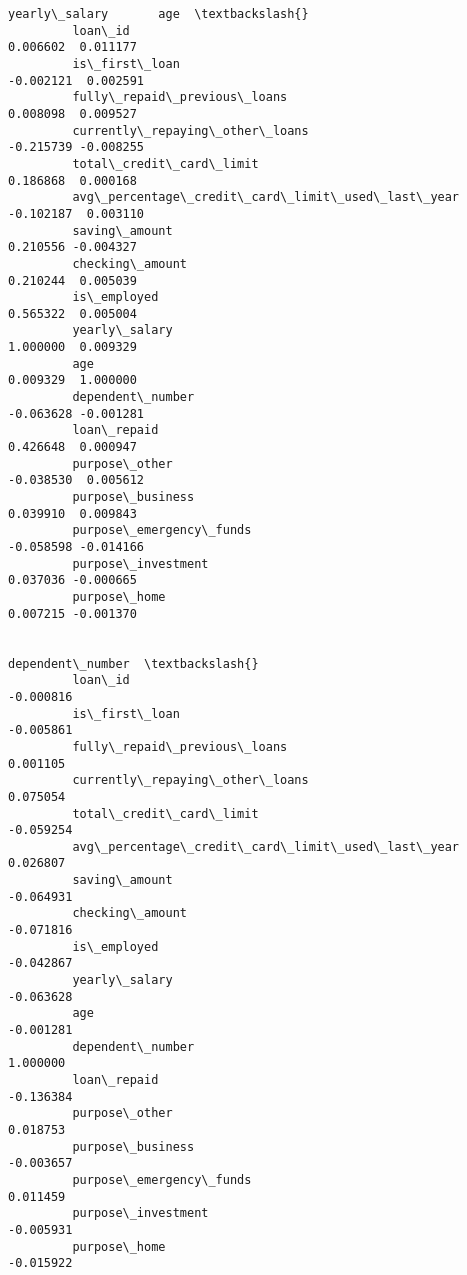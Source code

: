 \documentclass{report}
\begin{document}
\begin{Verbatim}[commandchars=\\\{\}]
                                                          yearly\_salary       age  \textbackslash{}
         loan\_id                                               0.006602  0.011177   
         is\_first\_loan                                        -0.002121  0.002591   
         fully\_repaid\_previous\_loans                           0.008098  0.009527   
         currently\_repaying\_other\_loans                       -0.215739 -0.008255   
         total\_credit\_card\_limit                               0.186868  0.000168   
         avg\_percentage\_credit\_card\_limit\_used\_last\_year      -0.102187  0.003110   
         saving\_amount                                         0.210556 -0.004327   
         checking\_amount                                       0.210244  0.005039   
         is\_employed                                           0.565322  0.005004   
         yearly\_salary                                         1.000000  0.009329   
         age                                                   0.009329  1.000000   
         dependent\_number                                     -0.063628 -0.001281   
         loan\_repaid                                           0.426648  0.000947   
         purpose\_other                                        -0.038530  0.005612   
         purpose\_business                                      0.039910  0.009843   
         purpose\_emergency\_funds                              -0.058598 -0.014166   
         purpose\_investment                                    0.037036 -0.000665   
         purpose\_home                                          0.007215 -0.001370   
         
                                                          dependent\_number  \textbackslash{}
         loan\_id                                                 -0.000816   
         is\_first\_loan                                           -0.005861   
         fully\_repaid\_previous\_loans                              0.001105   
         currently\_repaying\_other\_loans                           0.075054   
         total\_credit\_card\_limit                                 -0.059254   
         avg\_percentage\_credit\_card\_limit\_used\_last\_year          0.026807   
         saving\_amount                                           -0.064931   
         checking\_amount                                         -0.071816   
         is\_employed                                             -0.042867   
         yearly\_salary                                           -0.063628   
         age                                                     -0.001281   
         dependent\_number                                         1.000000   
         loan\_repaid                                             -0.136384   
         purpose\_other                                            0.018753   
         purpose\_business                                        -0.003657   
         purpose\_emergency\_funds                                  0.011459   
         purpose\_investment                                      -0.005931   
         purpose\_home                                            -0.015922   
         

\end{Verbatim}
\end{document}
